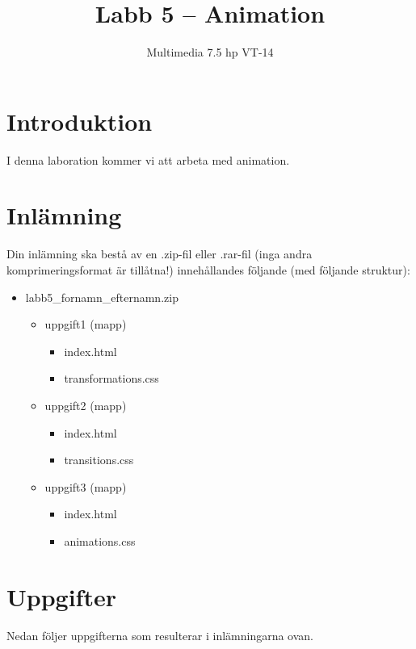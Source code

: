 \documentclass[12pt]{article}
\date{}
\title{ Labb 5 -- Animation }
\author{ Multimedia 7.5 hp VT-14 }
\begin{document}
\maketitle
\vspace{-3.5em}




\section{Introduktion}
I denna laboration kommer vi att arbeta med animation.

\section{Inlämning}
Din inlämning ska bestå av en .zip-fil eller .rar-fil (inga andra komprimeringsformat är tillåtna!) innehållandes följande (med följande struktur):
  \begin{itemize}
    \item labb5\_fornamn\_efternamn.zip
      \vspace{-0.5em}
      \begin{itemize}
        \item uppgift1 (mapp)
          \begin{itemize}
            \item index.html
            \item transformations.css
          \end{itemize}
        \item uppgift2 (mapp)
          \begin{itemize}
            \item index.html
            \item transitions.css
          \end{itemize}
        \item uppgift3 (mapp)
          \begin{itemize}
            \item index.html
            \item animations.css
          \end{itemize}
    \end{itemize}
  \end{itemize}



\section{Uppgifter}
Nedan följer uppgifterna som resulterar i inlämningarna ovan.
\end{document}
